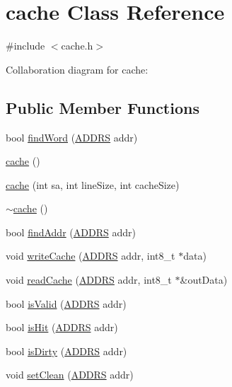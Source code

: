 \hypertarget{classcache}{
\section{cache Class Reference}
\label{classcache}
}


{\ttfamily \#include $<$cache.h$>$}



Collaboration diagram for cache:
\subsection*{Public Member Functions}
\begin{DoxyCompactItemize}
\item 
bool \hyperlink{classcache_a93fb585ef6a736b9831dc21bb193d96f}{findWord} (\hyperlink{global_2global_8h_a7ea74bb9ffd2e4d41550ae2383dd25bc}{ADDRS} addr)
\item 
\hyperlink{classcache_a13bdadd498ed51df4b1a8431ddf700bd}{cache} ()
\item 
\hyperlink{classcache_a44b0c0aa85b39105f5c360ebcf3a4495}{cache} (int sa, int lineSize, int cacheSize)
\item 
\hyperlink{classcache_a4a4f36a52e9ad046af986ce9095616a5}{$\sim$cache} ()
\item 
bool \hyperlink{classcache_ab524f6f2badf04b54b438d95f154fadf}{findAddr} (\hyperlink{global_2global_8h_a7ea74bb9ffd2e4d41550ae2383dd25bc}{ADDRS} addr)
\item 
void \hyperlink{classcache_ab3b31a1d08bf67d960705e8b7e631546}{writeCache} (\hyperlink{global_2global_8h_a7ea74bb9ffd2e4d41550ae2383dd25bc}{ADDRS} addr, int8\_\-t $\ast$data)
\item 
void \hyperlink{classcache_a8543792b7d9060b3701cb1b67d417b44}{readCache} (\hyperlink{global_2global_8h_a7ea74bb9ffd2e4d41550ae2383dd25bc}{ADDRS} addr, int8\_\-t $\ast$\&outData)
\item 
bool \hyperlink{classcache_a2c8e87daacbe31a4780e06db9d571742}{isValid} (\hyperlink{global_2global_8h_a7ea74bb9ffd2e4d41550ae2383dd25bc}{ADDRS} addr)
\item 
bool \hyperlink{classcache_af39bc5f11fbca905873c840a8dcfb9b9}{isHit} (\hyperlink{global_2global_8h_a7ea74bb9ffd2e4d41550ae2383dd25bc}{ADDRS} addr)
\item 
bool \hyperlink{classcache_ab1edc7f06068472ac043cbd293ae83ea}{isDirty} (\hyperlink{global_2global_8h_a7ea74bb9ffd2e4d41550ae2383dd25bc}{ADDRS} addr)
\item 
void \hyperlink{classcache_a88790ea3a4e3583eaae71a365e9568e7}{setClean} (\hyperlink{global_2global_8h_a7ea74bb9ffd2e4d41550ae2383dd25bc}{ADDRS} addr)

\end{DoxyCompactItemize}
